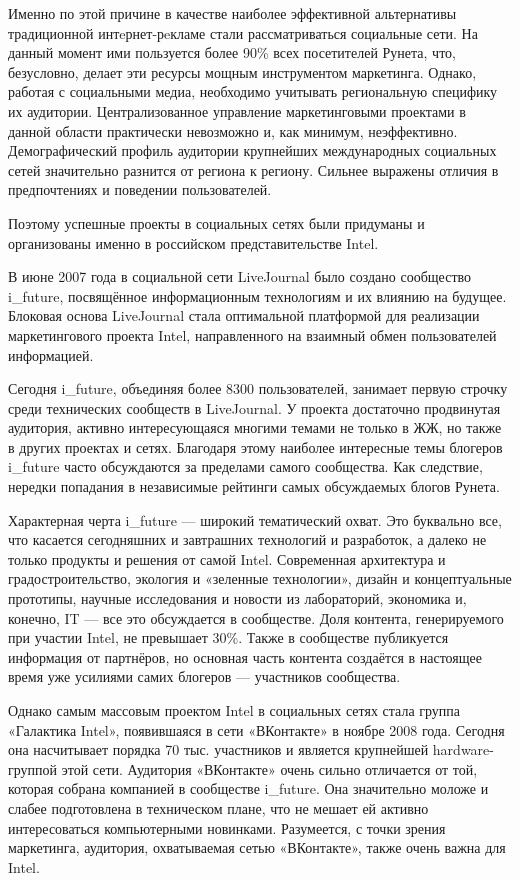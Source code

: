 \documentclass[a4paper,english,russian]{G2-105}
\begin{document}
\par Именно по этой причине в качестве наиболее эффективной альтернативы традиционной интeрнет-рeкламе стали рассматриваться социальные сети. На данный момент ими пользуется более 90\% всех посетителей Рунета, что, безусловно, делает эти ресурсы мощным инструментом маркетинга. Однако, работая с социальными медиа, необходимо учитывать региональную специфику их аудитории. Централизованное управление маркетинговыми проектами в данной области практически невозможно и, как минимум, неэффективно. Демографический профиль аудитории крупнейших международных социальных сетей значительно разнится от региона к региону. Сильнее выражены отличия в предпочтениях и поведении пользователей.
\par Поэтому успешные проекты в социальных сетях были придуманы и организованы именно в российском представительстве Intel.
\par В июне 2007 года в социальной сети LiveJournal было создано сообщество i\_future, посвящённое информационным технологиям и их влиянию на будущее. Блоковая основа LiveJournal стала оптимальной платформой для реализации маркетингового проекта Intel, направленного на взаимный обмен пользователей информацией.
\par Сегодня i\_future, объединяя более 8300 пользователей, занимает первую строчку среди технических сообществ в LiveJournal. У проекта достаточно продвинутая аудитория, активно интересующаяся многими темами не только в ЖЖ, но также в других проектах и сетях. Благодаря этому наиболее интересные темы блогеров i\_future часто обсуждаются за пределами самого сообщества. Как следствие, нередки попадания в независимые рейтинги самых обсуждаемых блогов Рунета.
\par Характерная черта i\_future --- широкий тематический охват. Это буквально все, что касается сегодняшних и завтрашних технологий и разработок, а далеко не только продукты и решения от самой Intel. Современная архитектура и градостроительство, экология и «зеленные технологии», дизайн и концептуальные прототипы, научные исследования и новости из лабораторий, экономика и, конечно, IT --- все это обсуждается в сообществе. Доля контента, генерируемого при участии Intel, не превышает 30\%. Также в сообществе публикуется информация от партнёров, но основная часть контента создаётся в настоящее время уже усилиями самих блогеров --- участников сообщества.
\par Однако самым массовым проектом Intel в социальных сетях стала группа «Галактика Intel», появившаяся в сети «ВКонтакте» в ноябре 2008 года. Сегодня она насчитывает порядка 70 тыс. участников и является крупнейшей hardware-группой этой сети. Аудитория «ВКонтакте» очень сильно отличается от той, которая собрана компанией в сообществе i\_future. Она значительно моложе и слабее подготовлена в техническом плане, что не мешает ей активно интересоваться компьютерными новинками. Разумеется, с точки зрения маркетинга, аудитория, охватываемая сетью «ВКонтакте», также очень важна для Intel.
\end{document}
